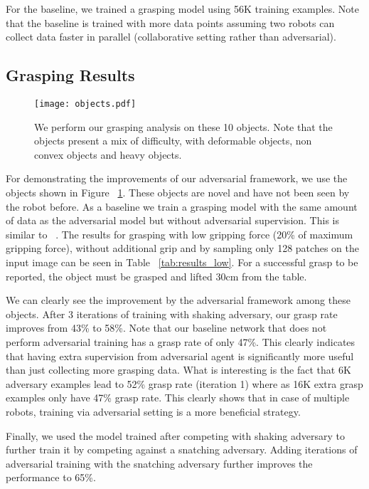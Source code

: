 \documentclass[letterpaper, 10 pt, conference]{ieeeconf}  %
\begin{document}
For the baseline, we trained a grasping model using 56K training examples. Note that the baseline is trained with more data points assuming two robots can collect data faster in parallel (collaborative setting rather than adversarial).

\subsection{Grasping Results}\begin{figure}[t!]
\begin{center}
\texttt{[image: objects.pdf]}
\end{center}
\caption{We perform our grasping analysis on these 10 objects. Note that the objects present a mix of difficulty, with deformable objects, non convex objects and heavy objects.}
\label{fig:objects}
\end{figure}

For demonstrating the improvements of our adversarial framework, we use the objects shown in Figure ~\ref{fig:objects}. These objects are novel and have not been seen by the robot before. As a baseline we train a grasping model with the same amount of data as the adversarial model but without adversarial supervision. This is similar to ~\cite{pinto2016supersizing}.
The results for grasping with low gripping force (20\% of maximum gripping force), without additional grip and by sampling only 128 patches on the input image can be seen in Table ~\ref{tab:results_low}. For a successful grasp to be reported, the object must be grasped and lifted 30cm from the table. 

We can clearly see the improvement by the adversarial framework among these objects. After 3 iterations of training with shaking adversary, our grasp rate improves from 43\% to 58\%. Note that our baseline network that does not perform adversarial training has a grasp rate of only 47\%. This clearly indicates that having extra supervision from adversarial agent is significantly more useful than just collecting more grasping data. What is interesting is the fact that 6K adversary examples lead to 52\% grasp rate (iteration 1) where as 16K extra grasp examples only have 47\% grasp rate. This clearly shows that in case of multiple robots, training via adversarial setting is a more beneficial strategy.

Finally, we used the model trained after competing with shaking adversary to further train it by competing against a snatching adversary. Adding iterations of adversarial training with the snatching adversary further improves the performance to 65\%.
\end{document}
